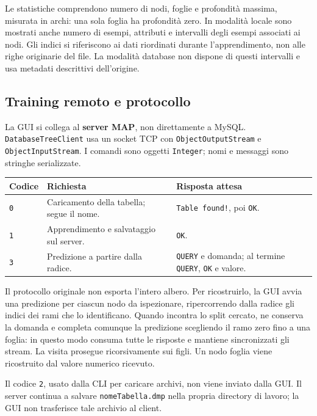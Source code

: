 Le statistiche comprendono numero di nodi, foglie e profondità massima,
misurata in archi: una sola foglia ha profondità zero. In modalità locale
sono mostrati anche numero di esempi, attributi e intervalli degli esempi
associati ai nodi. Gli indici si riferiscono ai dati riordinati durante
l'apprendimento, non alle righe originarie del file. La modalità database
non dispone di questi intervalli e usa metadati descrittivi dell'origine.

\subsection*{Training remoto e protocollo}

La GUI si collega al \textbf{server MAP}, non direttamente a MySQL.
\texttt{DatabaseTreeClient} usa un socket TCP con
\texttt{ObjectOutputStream} e \texttt{ObjectInputStream}. I comandi sono
oggetti \texttt{Integer}; nomi e messaggi sono stringhe serializzate.

\begin{center}
\begin{tabularx}{\textwidth}{@{}lXX@{}}
\toprule
\textbf{Codice} & \textbf{Richiesta} & \textbf{Risposta attesa} \\
\midrule
\texttt{0} & Caricamento della tabella; segue il nome. &
\texttt{Table found!}, poi \texttt{OK}. \\
\texttt{1} & Apprendimento e salvataggio sul server. & \texttt{OK}. \\
\texttt{3} & Predizione a partire dalla radice. &
\texttt{QUERY} e domanda; al termine \texttt{QUERY}, \texttt{OK} e valore. \\
\bottomrule
\end{tabularx}
\end{center}

Il protocollo originale non esporta l'intero albero. Per ricostruirlo, la GUI
avvia una predizione per ciascun nodo da ispezionare, ripercorrendo dalla
radice gli indici dei rami che lo identificano. Quando incontra lo split
cercato, ne conserva la domanda e completa comunque la predizione scegliendo
il ramo zero fino a una foglia: in questo modo consuma tutte le risposte e
mantiene sincronizzati gli stream. La visita prosegue ricorsivamente sui
figli. Un nodo foglia viene ricostruito dal valore numerico ricevuto.

Il codice \texttt{2}, usato dalla CLI per caricare archivi, non viene inviato
dalla GUI. Il server continua a salvare \texttt{nomeTabella.dmp} nella propria
directory di lavoro; la GUI non trasferisce tale archivio al client.


